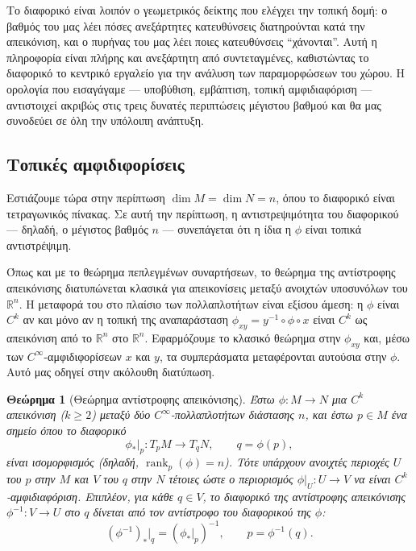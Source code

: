 \documentclass[11pt,a4paper,twoside,openright]{book}
\newtheorem{theorem}[lemma]{Θεώρημα}
\begin{document}
Το διαφορικό είναι λοιπόν ο γεωμετρικός δείκτης που ελέγχει την τοπική δομή: ο βαθμός του μας λέει πόσες ανεξάρτητες κατευθύνσεις διατηρούνται κατά την απεικόνιση, και ο πυρήνας του μας λέει ποιες κατευθύνσεις ``χάνονται''. Αυτή η πληροφορία είναι πλήρης και ανεξάρτητη από συντεταγμένες, καθιστώντας το διαφορικό το κεντρικό εργαλείο για την ανάλυση των παραμορφώσεων του χώρου. Η ορολογία που εισαγάγαμε --- υποβύθιση, εμβάπτιση, τοπική αμφιδιαφόριση --- αντιστοιχεί ακριβώς στις τρεις δυνατές περιπτώσεις μέγιστου βαθμού και θα μας συνοδεύει σε όλη την υπόλοιπη ανάπτυξη.

\subsection{Τοπικές αμφιδιφορίσεις}

Εστιάζουμε τώρα στην περίπτωση $\dim M = \dim N = n$, όπου το διαφορικό είναι τετραγωνικός πίνακας. Σε αυτή την περίπτωση, η αντιστρεψιμότητα του διαφορικού --- δηλαδή, ο μέγιστος βαθμός $n$ --- συνεπάγεται ότι η ίδια η $\phi$ είναι τοπικά αντιστρέψιμη.

Όπως και με το θεώρημα πεπλεγμένων συναρτήσεων, το θεώρημα της αντίστροφης απεικόνισης διατυπώνεται κλασικά για απεικονίσεις μεταξύ ανοιχτών υποσυνόλων του $\mathbb{R}^n$. Η μεταφορά του στο πλαίσιο των πολλαπλοτήτων είναι εξίσου άμεση: η $\phi$ είναι $C^k$ αν και μόνο αν η τοπική της αναπαράσταση $\phi_{xy} = y^{-1} \circ \phi \circ x$ είναι $C^k$ ως απεικόνιση από το $\mathbb{R}^n$ στο $\mathbb{R}^n$. Εφαρμόζουμε το κλασικό θεώρημα στην $\phi_{xy}$ και, μέσω των $C^\infty$-αμφιδιφορίσεων $x$ και $y$, τα συμπεράσματα μεταφέρονται αυτούσια στην $\phi$. Αυτό μας οδηγεί στην ακόλουθη διατύπωση.

\begin{theorem}[Θεώρημα αντίστροφης απεικόνισης]
Έστω $\phi: M \to N$ μια $C^k$ απεικόνιση ($k \geq 2$) μεταξύ δύο $C^\infty$-πολλαπλοτήτων διάστασης $n$, και έστω $p \in M$ ένα σημείο όπου το διαφορικό
\begin{equation}
\phi_*|_p: T_pM \to T_{q}N, \qquad q = \phi(p),
\end{equation}
είναι ισομορφισμός (δηλαδή, $\operatorname{rank}_p(\phi) = n$). Τότε υπάρχουν ανοιχτές περιοχές $U$ του $p$ στην $M$ και $V$ του $q$ στην $N$ τέτοιες ώστε ο περιορισμός $\phi|_U: U \to V$ να είναι $C^k$-αμφιδιαφόριση. Επιπλέον, για κάθε $q \in V$, το διαφορικό της αντίστροφης απεικόνισης $\phi^{-1}: V \to U$ στο $q$ δίνεται από τον αντίστροφο του διαφορικού της $\phi$:
\begin{equation}
(\phi^{-1})_*|_q = (\phi_*|_p)^{-1}, \qquad p = \phi^{-1}(q).
\end{equation}
\end{theorem}
\end{document}
